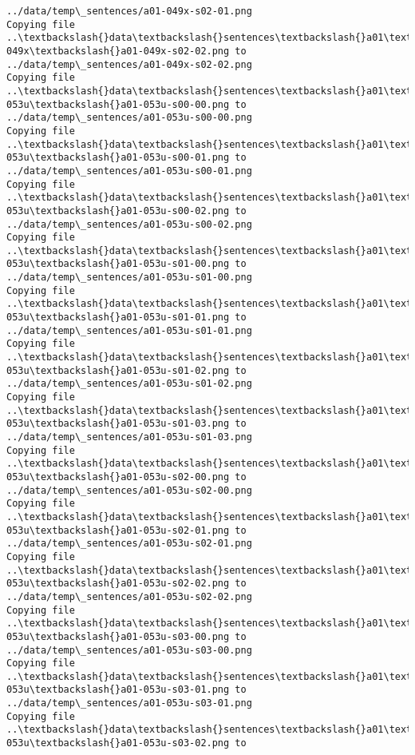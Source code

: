\documentclass[11pt]{article}
\begin{document}
\begin{Verbatim}[commandchars=\\\{\}]
../data/temp\_sentences/a01-049x-s02-01.png
Copying file ..\textbackslash{}data\textbackslash{}sentences\textbackslash{}a01\textbackslash{}a01-049x\textbackslash{}a01-049x-s02-02.png to
../data/temp\_sentences/a01-049x-s02-02.png
Copying file ..\textbackslash{}data\textbackslash{}sentences\textbackslash{}a01\textbackslash{}a01-053u\textbackslash{}a01-053u-s00-00.png to
../data/temp\_sentences/a01-053u-s00-00.png
Copying file ..\textbackslash{}data\textbackslash{}sentences\textbackslash{}a01\textbackslash{}a01-053u\textbackslash{}a01-053u-s00-01.png to
../data/temp\_sentences/a01-053u-s00-01.png
Copying file ..\textbackslash{}data\textbackslash{}sentences\textbackslash{}a01\textbackslash{}a01-053u\textbackslash{}a01-053u-s00-02.png to
../data/temp\_sentences/a01-053u-s00-02.png
Copying file ..\textbackslash{}data\textbackslash{}sentences\textbackslash{}a01\textbackslash{}a01-053u\textbackslash{}a01-053u-s01-00.png to
../data/temp\_sentences/a01-053u-s01-00.png
Copying file ..\textbackslash{}data\textbackslash{}sentences\textbackslash{}a01\textbackslash{}a01-053u\textbackslash{}a01-053u-s01-01.png to
../data/temp\_sentences/a01-053u-s01-01.png
Copying file ..\textbackslash{}data\textbackslash{}sentences\textbackslash{}a01\textbackslash{}a01-053u\textbackslash{}a01-053u-s01-02.png to
../data/temp\_sentences/a01-053u-s01-02.png
Copying file ..\textbackslash{}data\textbackslash{}sentences\textbackslash{}a01\textbackslash{}a01-053u\textbackslash{}a01-053u-s01-03.png to
../data/temp\_sentences/a01-053u-s01-03.png
Copying file ..\textbackslash{}data\textbackslash{}sentences\textbackslash{}a01\textbackslash{}a01-053u\textbackslash{}a01-053u-s02-00.png to
../data/temp\_sentences/a01-053u-s02-00.png
Copying file ..\textbackslash{}data\textbackslash{}sentences\textbackslash{}a01\textbackslash{}a01-053u\textbackslash{}a01-053u-s02-01.png to
../data/temp\_sentences/a01-053u-s02-01.png
Copying file ..\textbackslash{}data\textbackslash{}sentences\textbackslash{}a01\textbackslash{}a01-053u\textbackslash{}a01-053u-s02-02.png to
../data/temp\_sentences/a01-053u-s02-02.png
Copying file ..\textbackslash{}data\textbackslash{}sentences\textbackslash{}a01\textbackslash{}a01-053u\textbackslash{}a01-053u-s03-00.png to
../data/temp\_sentences/a01-053u-s03-00.png
Copying file ..\textbackslash{}data\textbackslash{}sentences\textbackslash{}a01\textbackslash{}a01-053u\textbackslash{}a01-053u-s03-01.png to
../data/temp\_sentences/a01-053u-s03-01.png
Copying file ..\textbackslash{}data\textbackslash{}sentences\textbackslash{}a01\textbackslash{}a01-053u\textbackslash{}a01-053u-s03-02.png to

\end{Verbatim}
\end{document}
